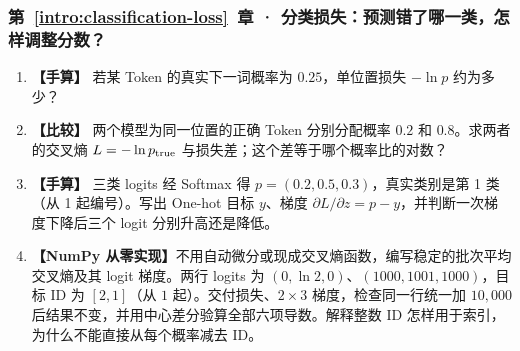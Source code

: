 \subsubsection*{第~\ref*{intro:classification-loss}~章 · 分类损失：预测错了哪一类，怎样调整分数？}
\begin{enumerate}[label={},leftmargin=4.8em,itemsep=4pt]
\item[\textbf{C-044.}] \leavevmode{}\label{exercise:C-044}\label{exercise:single-token-cross-entropy}\textbf{【手算】} 若某 Token 的真实下一词概率为 $0.25$，单位置损失 $-\ln p$ 约为多少？
\item[\textbf{C-045.}] \leavevmode{}\label{exercise:C-045}\label{exercise:probability-loss-ratio}\textbf{【比较】} 两个模型为同一位置的正确 Token 分别分配概率 $0.2$ 和 $0.8$。求两者的交叉熵 $L=-\ln p_{\rm true}$ 与损失差；这个差等于哪个概率比的对数？
\item[\textbf{C-046.}] \leavevmode{}\label{exercise:C-046}\label{exercise:softmax-logit-gradient}\textbf{【手算】} 三类 logits 经 Softmax 得 $p=(0.2,0.5,0.3)$，真实类别是第 1 类（从 1 起编号）。写出 One-hot 目标 $y$、梯度 $\partial L/\partial z=p-y$，并判断一次梯度下降后三个 logit 分别升高还是降低。
\item[\textbf{C-047.}] \leavevmode{}\label{exercise:C-047}\label{exercise:one-hot-gradient-target}\textbf{【NumPy 从零实现】}不用自动微分或现成交叉熵函数，编写稳定的批次平均交叉熵及其 logit 梯度。两行 logits 为 $(0,\ln2,0)$、$(1000,1001,1000)$，目标 ID 为 $[2,1]$（从 $1$ 起）。交付损失、$2\times3$ 梯度，检查同一行统一加 $10{,}000$ 后结果不变，并用中心差分验算全部六项导数。解释整数 ID 怎样用于索引，为什么不能直接从每个概率减去 ID。
\end{enumerate}

